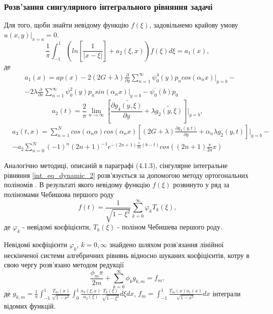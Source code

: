 \subsubsection{Розв'зання сингулярного інтегрального рівняння задачі}
Для того, щоби знайти невідому функцію $f(\xi)$, задовільнемо крайову умову $u(x, y) |_{x=a} = 0$.
\begin{equation}\label{int_eq_dynamic_2}
    \frac{1}{\pi} \int_{-1}^{1} \left( ln\left[ \frac{1}{\lvert x - \xi \rvert} \right] + a_2(\xi, x) \right) f(\xi) d\xi = a_1(x),
\end{equation}
де
\begin{align*}
    &a_1(x) = a p(x) - 2(2G + \lambda) \frac{\partial}{\partial y} \sum_{n=1}^{\infty} \psi_0^{4}(y) p_n cos(\alpha_n x)|_{y=b} - \nonumber \\
    &- 2\lambda \frac{\partial}{\partial x} \sum_{n=1}^{\infty}\psi_0^2(y) p_n sin(\alpha_n x)|_{y=b} - \psi_0^{'}(b) p_0
\end{align*}
\begin{equation*}
    a_2(t) = \frac{2}{\pi} \lim_{n \rightarrow \infty}\left[ \frac{\partial \widetilde{g_4(y, \xi)}}{\partial y} + \lambda \widetilde{g_2(y, \xi)} \right]|_{y=b}, 
\end{equation*}
\begin{align*}
    &a_3(t, x) = \sum_{n=1}^{N} cos(\alpha_n a) cos(\alpha_n x) \left[(2G + \lambda) \frac{\partial g_4(y, t)}{\partial y} + \alpha_n \lambda g_2(y, t) \right]|_{y=b} - \\
    & - a_2 \sum_{n=0}^{N} (-1)^n (2n + 1)^{-1} e^{-(2n + 1) \frac{\pi}{2a} (b - t)} cos((2n + 1) \frac{\pi}{2a} x)
\end{align*}

Аналогічно методиці, описаній в параграфі (4.1.3), сінгулярне інтегральне рівняння \eqref{int_eq_dynamic_2}
розв'язується за допомогою методу ортогональних поліномів \cite{popov_3}.
В результаті якого невідому функцію $f(\xi)$ розвинуто у ряд за поліномами Чебишова першого роду
\begin{equation}\label{unk_fun_dynamic_2}
    f(t) = \frac{1}{\sqrt{1 - \xi^2}} \sum_{k=0}^{\infty} \varphi_k T_{k}(\xi),
\end{equation}
де $\varphi_k$ - невідомі коєфіцієнти, $T_{k}(\xi)$ - поліном Чебишева першого роду.

Невідомі коєфіцієнти $\varphi_k$, $k=\overline{0, \infty}$ знайдено шляхом розв'язання лінійної нескінченої системи алгебричних рівнянь відносно шуканих коєфіцієнтів,
котру в свою чергу розв'язано методом редукції
\begin{equation}\label{int_system_dynamic_2}
    \frac{\phi_m \pi}{2m} + \sum_{k=0}^{\infty} \phi_k g_{k, m} = f_m,
\end{equation}
де $g_{k, m} = \frac{1}{\pi} \int_{-1}^{1} \frac{T_{m}(x)}{\sqrt{1 - x^2}} \int_{0}^{1} \frac{a_3(\xi, x )}{a_2(\xi)} \frac{T_{k}(\xi)}{\sqrt{1 - \xi^2}} d\xi dx$,
$f_m = \int_{-1}^{1} \frac{T_{m}(x) a_1(x)}{\sqrt{1 - x^2}} dx$ інтеграли відомих функцій.
